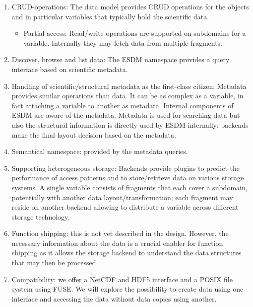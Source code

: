 \begin{enumerate}
\item CRUD-operations: The data model provides CRUD operations for the objects and in particular variables that typically hold the scientific data.
\begin{itemize}
\item Partial access: Read/write operations are supported on subdomains for a variable. Internally they may fetch data
from multiple fragments.
\end{itemize}
\item Discover, browse and list data: The ESDM namespace provides a query interface based on scientific metadata.

\item Handling of scientific/structural metadata as the first-class citizen: Metadata provides similar operations than data.
It can be as complex as a variable, in fact attaching a variable to another as metadata.
Internal components of ESDM are aware of the metadata.
Metadata is used for searching data but also the structural information is directly used by ESDM internally; backends make the final layout decision based on the metadata.

\item Semantical namespace: provided by the metadata queries.
\item Supporting heterogeneous storage: Backends provide plugins to predict the performance of access patterns and to store/retrieve data on various storage systems.
A single variable consists of fragments that each cover a subdomain, potentially with another data layout/transformation; each fragment may reside on another backend allowing to distribute a variable across different storage technology.

\item Function shipping: this is not yet described in the design. However, the necessary information about the data is a crucial enabler for function shipping as it allows the storage backend to understand the data structures that may then be processed.

\item Compatibility: we offer a NetCDF and HDF5 interface and a POSIX file system using FUSE.
We will explore the possibility to create data using one interface and accessing the data without data copies using another.
\end{enumerate}



